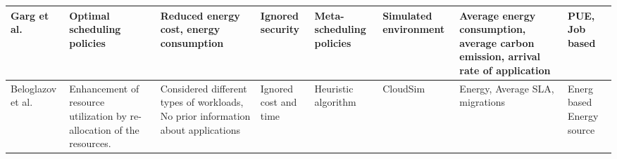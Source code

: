 \begin{table*}[!htbp]
{\begin{tabular}{|p{1.5cm} p{2cm} p{2cm} p{2cm} p{2cm} p{2cm} p{2cm} p{2cm}|}
Garg et al.~\cite{garg2011environment} &  Optimal scheduling policies & Reduced energy cost, energy consumption & Ignored security & Meta-scheduling policies & Simulated environment  & Average energy consumption, average carbon emission, arrival rate of application & PUE, Job based
 \\ \hline
 
Beloglazov et al.~\cite{beloglazov2010energy} &  Enhancement of resource utilization by re-allocation of the resources. & Considered different types of workloads, No prior information about applications & Ignored cost and time & Heuristic algorithm & CloudSim & Energy, Average SLA, migrations & Energ based Energy source
\\ \hline

\end{tabular}
}
\end{table*}